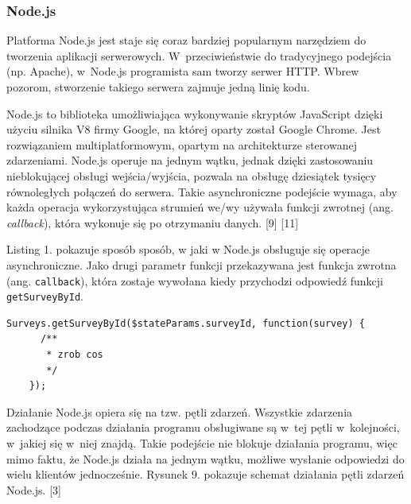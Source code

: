 \documentclass[8pt,a4paper,notitlepage]{article}
\begin{document}
\subsubsection{Node.js}
Platforma  Node.js jest staje się coraz bardziej popularnym narzędziem do tworzenia aplikacji serwerowych. W~przeciwieństwie do tradycyjnego podejścia (np. Apache), w~Node.js programista sam tworzy serwer HTTP. Wbrew pozorom, stworzenie takiego serwera zajmuje jedną linię kodu.
\par Node.js to biblioteka umożliwiająca wykonywanie skryptów JavaScript dzięki użyciu silnika V8 firmy Google, na której oparty został Google Chrome. Jest rozwiązaniem multiplatformowym, opartym na architekturze sterowanej zdarzeniami. Node.js operuje na jednym wątku, jednak dzięki zastosowaniu nieblokującej obsługi wejścia/wyjścia, pozwala na obsługę dziesiątek tysięcy równoległych połączeń do serwera. Takie asynchroniczne podejście wymaga, aby każda operacja wykorzystująca strumień we/wy używała funkcji zwrotnej (ang. \textit{callback}), która wykonuje się po otrzymaniu danych. [9] [11]
\par Listing 1. pokazuje sposób sposób, w jaki w Node.js obsługuje się operacje asynchroniczne. Jako drugi parametr funkcji przekazywana jest funkcja zwrotna (ang. \texttt{callback}), która zostaje wywołana kiedy przychodzi odpowiedź funkcji \texttt{getSurveyById}.
\begin{lstlisting}[caption=Przykład użycia funkcji zwrotnej w~pobraniu danych z~bazy danych. ]
Surveys.getSurveyById($stateParams.surveyId, function(survey) {
      /**
       * zrob cos
       */
    });
\end{lstlisting}
\par Działanie Node.js opiera się na tzw. pętli zdarzeń. Wszystkie zdarzenia zachodzące podczas działania programu obsługiwane są w~tej pętli w~kolejności, w~jakiej się w~niej znajdą. Takie podejście nie blokuje działania programu, więc mimo faktu, że Node.js działa na jednym wątku, możliwe wysłanie odpowiedzi do wielu klientów jednocześnie. Rysunek 9. pokazuje schemat działania pętli zdarzeń Node.js. [3]
\end{document}
